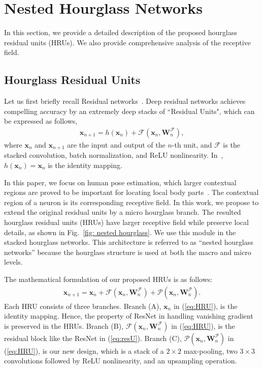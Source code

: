 \documentclass[10pt,twocolumn,letterpaper]{article}
\begin{document}
\section{Nested Hourglass Networks}\label{sec: Nested Hourglass unit}
In this section, we provide a detailed description of the proposed hourglass residual units (HRUs). We also provide comprehensive analysis of the receptive field.
\subsection{Hourglass Residual Units}

Let us first briefly recall Residual networks~\cite{he2016deep}.
Deep residual networks achieves compelling accuracy by an extremely deep stacks of ``Residual Units", which can be expressed as follows,
\begin{eqnarray}
\mathbf{x}_{n+1} = h(\mathbf{x}_n) + \mathcal{F}(\mathbf{x}_n, \mathbf{W}^{\mathcal{F}}_{n}), \label{eq:resU}
\end{eqnarray}
where $\mathbf{x}_n$ and $\mathbf{x}_{n+1}$ are the input and output of the $n$-th unit, 
and $\mathcal{F}$ is the stacked convolution, batch normalization, and ReLU nonlinearity. 
In~\cite{he2016deep}, $h(\mathbf{x}_n)=\mathbf{x}_n$ is the identity mapping.

In this paper, we focus on human pose estimation, which larger contextual regions are proved to be important for locating local body parts~\cite{wei2016convolutional,newell2016stacked}. 
The contextual region of a neuron is its corresponding receptive field. 
In this work, we propose to extend the original residual units by a micro hourglass branch. The resulted hourglass residual units (HRUs) have larger receptive field while preserve local details, as shown in Fig.~\ref{fig: nested hourglass}. We use this module in the stacked hourglass networks.
This architecture is referred to as ``nested hourglass networks'' because the hourglass structure is used at both the macro and micro levels. 
 
The mathematical formulation of our proposed HRUs is as follows:
\begin{eqnarray}
\mathbf{x}_{n+1} = \mathbf{x}_{n} + \mathcal{F}(\mathbf{x}_n, \mathbf{W}^{\mathcal{F}}_{n}) + \mathcal{P}(\mathbf{x}_{n}, \mathbf{W}^{\mathcal{P}}_{n}).
\label{eq:HRU}
\end{eqnarray}
Each HRU consists of three branches.
Branch (A), \ie $\mathbf{x}_{n}$ in (\ref{eq:HRU}), is the identity mapping. Hence, the property of ResNet in handling vanishing gradient is preserved in the HRUs.
Branch (B), \ie $\mathcal{F}(\mathbf{x}_n, \mathbf{W}^{\mathcal{F}}_{n})$ in (\ref{eq:HRU}),  is the residual block like the ResNet in (\ref{eq:resU}). 
Branch (C), \ie $\mathcal{P}(\mathbf{x}_{n}, \mathbf{W}^{\mathcal{P}}_{n})$ in (\ref{eq:HRU}), is our new design, which is a stack of a $2\times2$ max-pooling,  two $3\times 3$ convolutions followed by ReLU nonlinearity, and an upsampling operation. 
\end{document}
